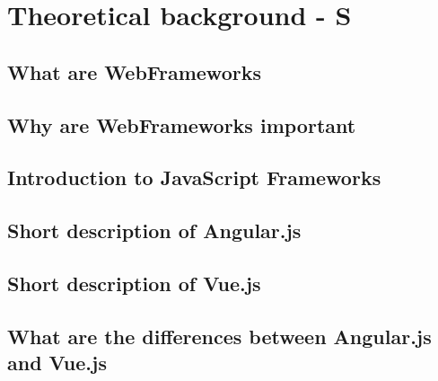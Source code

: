 \chapter{Theoretical background - S}

\section{What are WebFrameworks}

\section{Why are WebFrameworks important}

\section{Introduction to JavaScript Frameworks}

\section{Short description of Angular.js}

\section{Short description of Vue.js}

\section{What are the differences between Angular.js and Vue.js}